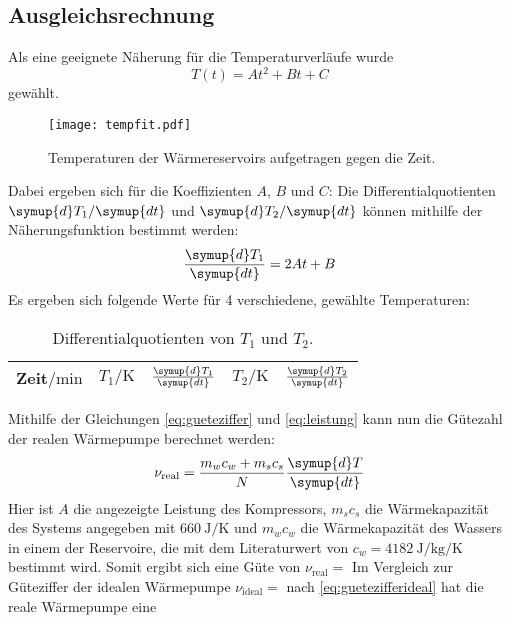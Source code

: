 \subsection{Ausgleichsrechnung}
Als eine geeignete Näherung für die Temperaturverläufe wurde
\begin{equation}
  \label{eq:tempfit}
  T(t) = At^2 + Bt + C
\end{equation}
gewählt.
\begin{figure}[H]
  \centering
  \texttt{[image: tempfit.pdf]}
  \caption{Temperaturen der Wärmereservoirs aufgetragen gegen die Zeit.}
  \label{fig:tempfit}
\end{figure}
Dabei ergeben sich für die Koeffizienten $A$, $B$ und $C$:
%
Die Differentialquotienten $\symup{d}T_1/\symup{dt}$ und $\symup{d}T_2/\symup{dt}$ können mithilfe der Näherungsfunktion 
bestimmt werden:
\begin{equation}
    \frac{\symup{d}T_1}{\symup{dt}} = 2At + B
\end{equation}
Es ergeben sich folgende Werte für 4 verschiedene, gewählte Temperaturen:
\begin{table}[H]
    \centering
    \caption{Differentialquotienten von $T_1$ und $T_2$.}
    \label{tab:t2}
    \begin{tabular}{S S S S S}
        \toprule
        {Zeit$/\si{\minute}$} & {$T_1/\si{\kelvin}$} & {$\frac{\symup{d}T_1}{\symup{dt}}$} & {$T_2/\si{\kelvin}$} & {$\frac{\symup{d}T_2}{\symup{dt}}$} \\
        \midrule
        \bottomrule
    \end{tabular}
\end{table}
%
Mithilfe der Gleichungen \eqref{eq:gueteziffer} und \eqref{eq:leistung} kann nun die Gütezahl der realen Wärmepumpe berechnet 
werden:
\begin{equation}
    \nu_\text{real} = \frac{m_wc_w + m_sc_s}{N}\frac{\symup{d}T}{\symup{dt}}
\end{equation}
Hier ist $A$ die angezeigte Leistung des Kompressors, $m_sc_s$ die Wärmekapazität des Systems angegeben mit 
$\SI{660}{\joule\per\kelvin}$ und $m_wc_w$ die Wärmekapazität des Wassers in einem der Reservoire, die mit dem Literaturwert 
von $c_w = \SI{4182}{\joule\per\kilogram\per\kelvin}$ \cite{const} bestimmt wird.
Somit ergibt sich eine Güte von $\nu_\text{real} = $
Im Vergleich zur Güteziffer der idealen Wärmepumpe $\nu_\text{ideal} = $ nach \eqref{eq:guetezifferideal} hat die reale Wärmepumpe eine 
